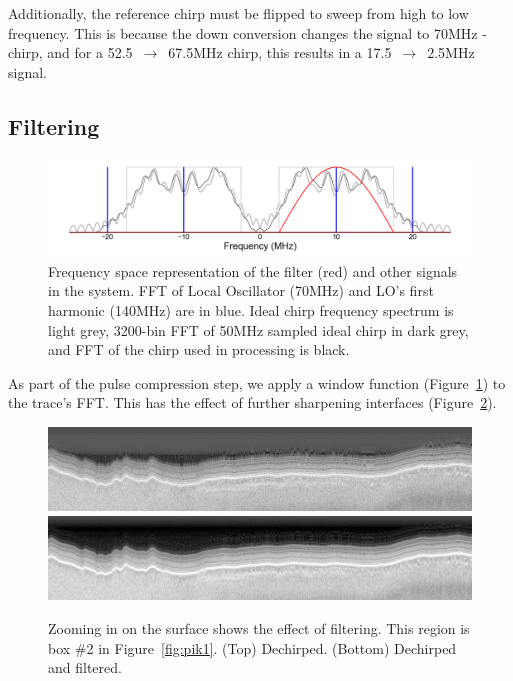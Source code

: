 \documentclass[11pt]{article}
\newcommand{\todo}[1]{\ifthenelse{\boolean{include-todos}} {\textcolor{Red}{\textbf{TODO: #1}}}{}}
\newcommand{\figref}[1]{Figure~\ref{#1}}
\begin{document}
Additionally, the reference chirp must be flipped to sweep from high to low frequency. This is because the down conversion changes the signal to 70MHz - chirp, and for a 52.5~$\rightarrow$~67.5MHz chirp, this results in a 17.5~$\rightarrow$~2.5MHz signal. 


\subsection{Filtering}
\label{sec:filtering}

\begin{figure}[h!]
\centering
\includegraphics[width=1.0\columnwidth]{figures/filter_frequencies.png}
\caption[]{Frequency space representation of the filter (red) and other signals in the system. FFT of Local Oscillator (70MHz) and LO's first harmonic (140MHz) are in blue. Ideal chirp frequency spectrum is light grey, 3200-bin FFT of 50MHz sampled ideal chirp in dark grey, and FFT of the chirp used in processing is black.}
\label{fig:filter_freqs}
\end{figure}

As part of the pulse compression step, we apply a window function (\figref{fig:filter_freqs}) to the trace's FFT. This has the effect of further sharpening interfaces (\figref{fig:filtered}). 



\begin{figure}[h!]
\centering
\includegraphics[width=1.0\columnwidth]{figures/TOT_dechirped_zoom1_small.jpg} \\
\vspace{2pt}
\includegraphics[width=1.0\columnwidth]{figures/TOT_filtered_zoom1_small.jpg}
\caption[]{Zooming in on the surface shows the effect of filtering. This region is box \#2 in \figref{fig:pik1}. (Top) Dechirped. (Bottom) Dechirped and filtered.}
\label{fig:filtered}
\end{figure}
\end{document}
